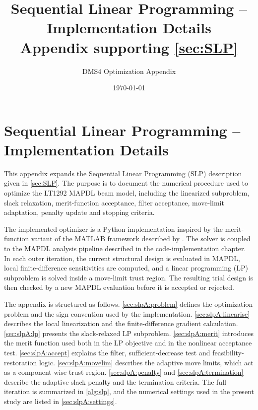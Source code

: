 \documentclass[11pt,a4paper]{article}
\title{Sequential Linear Programming -- Implementation Details\\
       \large Appendix supporting \autoref{sec:SLP}}
\author{DMS4 Optimization Appendix}
\date{\today}
\begin{document}
\maketitle

\section{Sequential Linear Programming -- Implementation Details}
\label{sec:SLP_appendix}

This appendix expands the Sequential Linear Programming (SLP)
description given in \autoref{sec:SLP}. The purpose is to
document the numerical procedure used to optimize the LT1292 MAPDL
beam model, including the linearized subproblem, slack relaxation,
merit-function acceptance, filter acceptance, move-limit adaptation,
penalty update and stopping criteria.

The implemented optimizer is a Python implementation inspired by the
merit-function variant of the MATLAB framework described by
\cite{sorensen2026fminslp}. The solver is coupled to the MAPDL
analysis pipeline described in the code-implementation chapter. In
each outer iteration, the current structural design is evaluated in
MAPDL, local finite-difference sensitivities are computed, and a
linear programming (LP) subproblem is solved inside a move-limit
trust region. The resulting trial design is then checked by a new
MAPDL evaluation before it is accepted or rejected.

The appendix is structured as follows. \autoref{sec:slpA:problem}
defines the optimization problem and the sign convention used by the
implementation. \autoref{sec:slpA:linearise} describes the local
linearization and the finite-difference gradient calculation.
\autoref{sec:slpA:lp} presents the slack-relaxed LP subproblem.
\autoref{sec:slpA:merit} introduces the merit function used both
in the LP objective and in the nonlinear acceptance test.
\autoref{sec:slpA:accept} explains the filter, sufficient-decrease
test and feasibility-restoration logic. \autoref{sec:slpA:movelim}
describes the adaptive move limits, which act as a component-wise
trust region. \autoref{sec:slpA:penalty} and
\autoref{sec:slpA:termination} describe the adaptive slack penalty and
the termination criteria. The full iteration is summarized in
\autoref{alg:slp}, and the numerical settings used in the present
study are listed in \autoref{sec:slpA:settings}.

\end{document}
